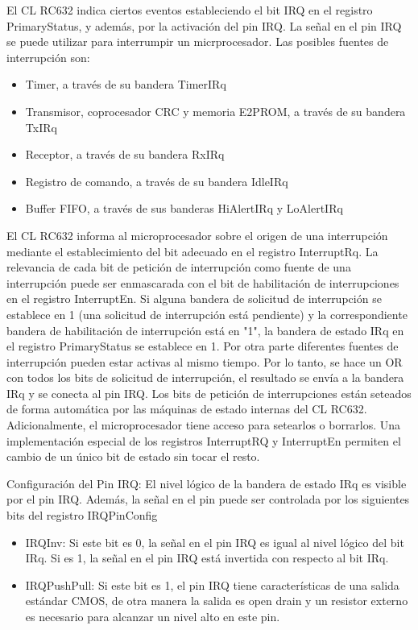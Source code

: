 \bigskip
{}

El CL RC632 indica ciertos eventos estableciendo el bit IRQ en el registro \\
PrimaryStatus, y además, por la activación del pin IRQ. La señal en el pin IRQ se puede utilizar para interrumpir un micrprocesador. 
Las posibles fuentes de interrupción son: 

\begin{itemize}

\item Timer, a través de su bandera TimerIRq 
\item Transmisor, coprocesador CRC y memoria E2PROM, a través de su bandera TxIRq 
\item Receptor, a través de su bandera RxIRq 
\item Registro de comando, a través de su bandera IdleIRq 
\item Buffer FIFO, a través de sus banderas HiAlertIRq y LoAlertIRq 

\end{itemize}

El CL RC632 informa al microprocesador sobre el origen de una interrupción mediante el establecimiento del bit adecuado en el registro InterruptRq. La relevancia de cada bit de petición de interrupción como fuente de una interrupción puede ser enmascarada con el bit de habilitación de interrupciones en el registro InterruptEn. 
Si alguna bandera de solicitud de interrupción se establece en 1 (una solicitud de interrupción está pendiente) y la correspondiente bandera de habilitación de interrupción está en "1", la bandera de estado IRq en el registro PrimaryStatus se establece en 1. 
Por otra parte diferentes fuentes de interrupción pueden estar activas al mismo tiempo. Por lo tanto, se hace un OR con todos los bits de solicitud de interrupción, el resultado se envía a la bandera IRq y se conecta al pin IRQ. 
Los bits de petición de interrupciones están seteados de forma automática por las máquinas de estado internas del CL RC632. Adicionalmente, el microprocesador tiene acceso para setearlos o borrarlos. 
Una implementación especial de los registros InterruptRQ y InterruptEn permiten el cambio de un único bit de estado sin tocar el resto. 

\bigskip
Configuración del Pin IRQ:
El nivel lógico de la bandera de estado IRq es visible por el pin IRQ. Además, la señal en el pin puede ser controlada por los siguientes bits del registro IRQPinConfig 
\begin{itemize}
\item IRQInv: Si este bit es 0, la señal en el pin IRQ es igual al nivel lógico del bit IRq. 
Si es 1, la señal en el pin IRQ está invertida con respecto al bit IRq. 
\item IRQPushPull:  Si este bit es 1, el pin IRQ tiene características de una salida estándar 				   CMOS, de otra manera la salida es open drain y un resistor externo es necesario para alcanzar un nivel alto en este pin. 
\end{itemize}

